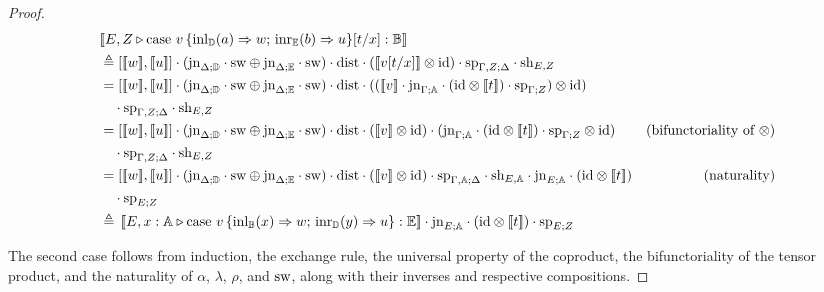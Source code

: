 \documentclass[10pt,a4paper]{amsart}
\theoremstyle{definition}
\theoremstyle{definition}
\theoremstyle{definition}
\theoremstyle{definition}
\theoremstyle{definition}
\theoremstyle{definition}
\begin{document}
\begin{proof}
\begin{align*}
  &[\![E, Z \vljud \text{case } v \,  \{\text{inl}_{\typeD} (a) \Rightarrow w ;\, \text{inr}_{\typeE} (b) \Rightarrow u\} [t/x]: \typeB]\!] \\
  & \triangleq \left[[\![ w ]\!] ,[\![ u ]\!]\right] \comp (\text{jn}_{\Delta;\typeD}\comp \sw \oplus \text{jn}_{\Delta;\typeE } \comp \sw) \comp \dist \comp  ([\![ v [t/x] ]\!]   \otimes \text{id})  \comp \text{sp}_{\Gamma, Z;\Delta} \comp \text{sh}_{E,Z} \\
  & = \left[[\![ w ]\!] ,[\![ u ]\!]\right] \comp (\text{jn}_{\Delta;\typeD}\comp \sw \oplus \text{jn}_{\Delta;\typeE } \comp \sw)  \comp \dist \comp (([\![ v]\!]  \comp \text{jn}_{\Gamma; \typeA} \comp (\text{id} \otimes [\![  t ]\!] ) \comp \text{sp}_{\Gamma;Z} )\otimes \text{id})  \\
  & \hspace{10pt} \comp \text{sp}_{\Gamma, Z;\Delta}\comp \text{sh}_{E,Z} \\
  & =  \left[[\![ w ]\!] ,[\![ u ]\!]\right] \comp (\text{jn}_{\Delta;\typeD}\comp \sw \oplus \text{jn}_{\Delta;\typeE } \comp \sw)  \comp \dist  \comp ([\![ v]\!] \otimes \text{id}) \comp (\text{jn}_{\Gamma; \typeA} \comp (\text{id} \otimes [\![  t ]\!] ) \comp \text{sp}_{\Gamma;Z} \otimes \text{id})   & {\text{(bifunctoriality of $\otimes$)}} \\
  & \hspace{10pt} \comp \text{sp}_{\Gamma, Z;\Delta} \comp \text{sh}_{E,Z}\\
  & = \left[[\![ w ]\!] ,[\![ u ]\!]\right] \comp (\text{jn}_{\Delta;\typeD}\comp \sw \oplus \text{jn}_{\Delta;\typeE } \comp \sw)  \comp \dist  \comp ([\![ v]\!] \otimes \text{id}) \comp \text{sp}_{\Gamma, \typeA;\Delta}  \comp \text{sh}_{E,\typeA}  \comp  \text{jn}_{E; \typeA} \comp (\text{id} \otimes [\![ t ]\!] )   & {(\text{naturality})}   \\
  &  \hspace{10pt} \comp \text{sp}_{E;Z}\\
  & \triangleq \, [\![E,  x:\typeA \vljud \text{case } v\,  \{\text{inl}_{\typeB} (x) \Rightarrow w ;\, \text{inr}_{\typeD} (y) \Rightarrow u\}: \typeE]\!]  \comp  \text{jn}_{E; \typeA} \comp (\text{id} \otimes [\![ t ]\!] ) \comp \text{sp}_{E;Z}
\end{align*}


The second case follows from induction, the exchange rule, the universal property of the coproduct,  the bifunctoriality of the tensor product, and the naturality of $\alpha$, $\lambda$, $\rho$, and $\mathrm{sw}$, along with their inverses and respective compositions.


\end{proof}
\end{document}
